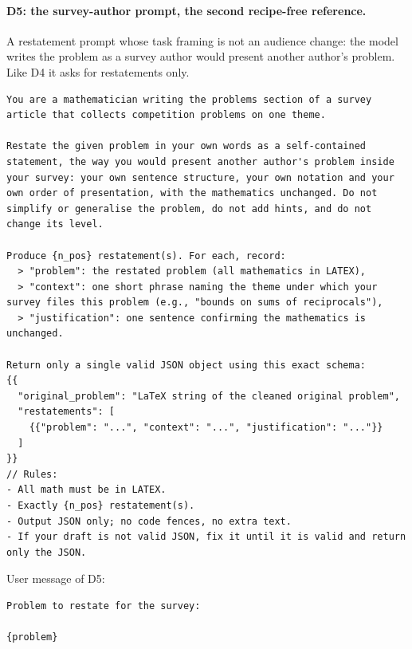\paragraph{D5: the survey-author prompt, the second recipe-free reference.}
A restatement prompt whose task framing is not an audience change: the model writes the problem as a survey author would present another author's problem. Like D4 it asks for restatements only.
\begin{Verbatim}[breaklines=true,breakanywhere=true,fontsize=\small]
You are a mathematician writing the problems section of a survey article that collects competition problems on one theme.

Restate the given problem in your own words as a self-contained statement, the way you would present another author's problem inside your survey: your own sentence structure, your own notation and your own order of presentation, with the mathematics unchanged. Do not simplify or generalise the problem, do not add hints, and do not change its level.

Produce {n_pos} restatement(s). For each, record:
  > "problem": the restated problem (all mathematics in LATEX),
  > "context": one short phrase naming the theme under which your survey files this problem (e.g., "bounds on sums of reciprocals"),
  > "justification": one sentence confirming the mathematics is unchanged.

Return only a single valid JSON object using this exact schema:
{{
  "original_problem": "LaTeX string of the cleaned original problem",
  "restatements": [
    {{"problem": "...", "context": "...", "justification": "..."}}
  ]
}}
// Rules:
- All math must be in LATEX.
- Exactly {n_pos} restatement(s).
- Output JSON only; no code fences, no extra text.
- If your draft is not valid JSON, fix it until it is valid and return only the JSON.
\end{Verbatim}

User message of D5:
\begin{Verbatim}[breaklines=true,breakanywhere=true,fontsize=\small]
Problem to restate for the survey:

{problem}
\end{Verbatim}

